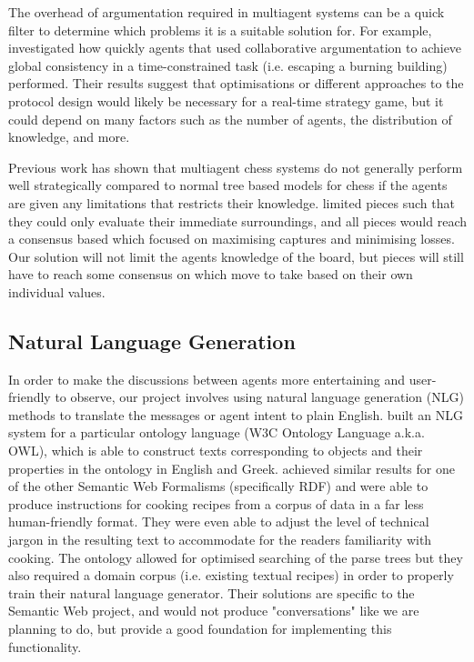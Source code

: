 \documentclass{article}
\begin{document}
The overhead of argumentation required in multiagent systems can be a quick filter to determine which problems it is a suitable solution for. For example, \cite{argumentationcontext} investigated how quickly agents that used collaborative argumentation to achieve global consistency in a time-constrained task (i.e. escaping a burning building) performed. Their results suggest that optimisations or different approaches to the protocol design would likely be necessary for a real-time strategy game, but it could depend on many factors such as the number of agents, the distribution of knowledge, and more.

Previous work has shown that multiagent chess systems do not generally perform well strategically compared to normal tree based models for chess if the agents are given any limitations that restricts their knowledge. \cite{agentchess} limited pieces such that they could only evaluate their immediate surroundings, and all pieces would reach a consensus based which focused on maximising captures and minimising losses. Our solution will not limit the agents knowledge of the board, but pieces will still have to reach some consensus on which move to take based on their own individual values. 

\subsection{Natural Language Generation}

In order to make the discussions between agents more entertaining and user-friendly to observe, our project involves using natural language generation (NLG) methods to translate the messages or agent intent to plain English. \cite{owlnlg} built an NLG system for a particular ontology language (W3C Ontology Language a.k.a. OWL), which is able to construct texts corresponding to objects and their properties in the ontology in English and Greek. \cite{rdfnlg} achieved similar results for one of the other Semantic Web Formalisms (specifically RDF) and were able to produce instructions for cooking recipes from a corpus of data in a far less human-friendly format. They were even able to adjust the level of technical jargon in the resulting text to accommodate for the readers familiarity with cooking. The ontology allowed for optimised searching of the parse trees but they also required a domain corpus (i.e. existing textual recipes) in order to properly train their natural language generator. Their solutions are specific to the Semantic Web project, and would not produce "conversations" like we are planning to do, but provide a good foundation for implementing this functionality.
\end{document}
